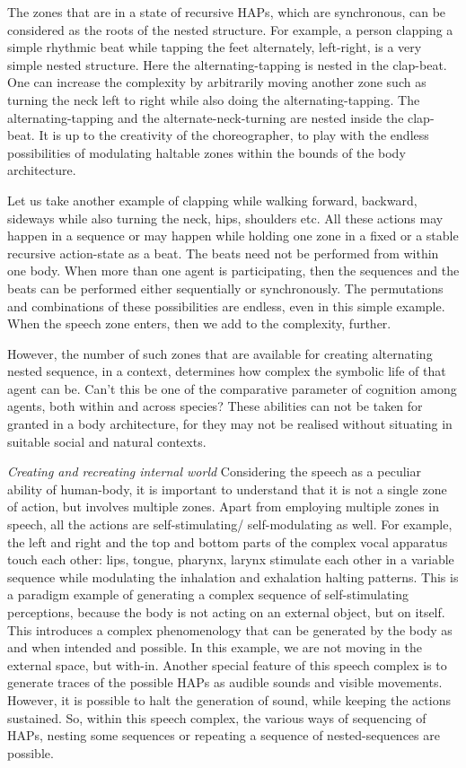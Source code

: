 The zones that are in a state of recursive HAPs, which are synchronous, can be considered as the roots of the nested structure. For example, a person clapping a simple rhythmic beat while tapping the feet alternately, left-right, is a very simple nested structure. Here the alternating-tapping is nested in the clap-beat. One can increase the complexity by arbitrarily moving another zone such as turning the neck left to right while also doing the alternating-tapping. The alternating-tapping and the alternate-neck-turning are nested inside the clap-beat. It is up to the creativity of the choreographer, to play with the endless possibilities of modulating haltable zones within the bounds of the body architecture.

Let us take another example of clapping while walking forward, backward, sideways while also turning the neck, hips, shoulders etc. All these actions may happen in a sequence or may happen while holding one zone in a fixed or a stable recursive action-state as a beat. The beats need not be performed from within one body. When more than one agent is participating, then the sequences and the beats can be performed either sequentially or synchronously. The permutations and combinations of these possibilities are endless, even in this simple example. When the speech zone enters, then we add to the complexity, further.

However, the number of such zones that are available for creating alternating nested sequence, in a context, determines how complex the symbolic life of that agent can be. Can't this be one of the comparative parameter of cognition among agents, both within and across species? These abilities can not be taken for granted in a body architecture, for they may not be realised without situating in suitable social and natural contexts.
 
\emph{Creating and recreating internal world} Considering the speech as a peculiar ability of human-body, it is important to understand that it is not a single zone of action, but involves multiple zones. Apart from employing multiple zones in speech, all the actions are self-stimulating/ self-modulating as well. For example, the left and right and the top and bottom parts of the complex vocal apparatus touch each other: lips, tongue, pharynx, larynx stimulate each other in a variable sequence while modulating the inhalation and exhalation halting patterns. This is a paradigm example of generating a complex sequence of self-stimulating perceptions, because the body is not acting on an external object, but on itself. This introduces a complex phenomenology that can be generated by the body as and when intended and possible. In this example, we are not moving in the external space, but with-in. Another special feature of this speech complex is to generate traces of the possible HAPs as audible sounds and visible movements. However, it is possible to halt the generation of sound, while keeping the actions sustained. So, within this speech complex, the various ways of sequencing of HAPs, nesting some sequences or repeating a sequence of nested-sequences are possible.

